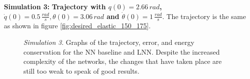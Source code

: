 \documentclass[a4paper]{article}
\begin{document}
\textbf{Simulation 3:} \textbf{Trajectory with $q(0)=2.66\, rad$, $\dot{q}(0)=0.5\, \frac{rad}{s}, \theta(0)=3.06\, rad$ and $\dot{\theta}(0)=1\, \frac{rad}{s}.$}
The trajectory is the same as shown in figure \ref{fig:desired_elastic_150_175}.

\begin{figure}
    \centering
    \qquad
    \caption{\textit{Simulation 3}. Graphs of the trajectory, error, and energy conservation for the NN baseline and LNN. Despite the increased complexity of the networks, the changes that have taken place are still too weak to speak of good results.}
    \label{fig:elastic_500_150_175}
\end{figure}
\end{document}
